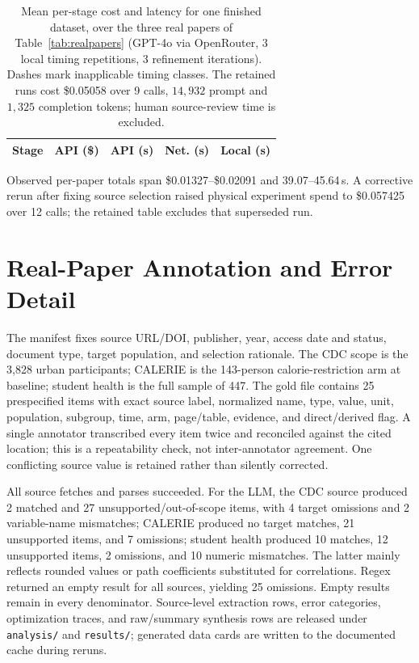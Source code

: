 \documentclass[letterpaper]{article} %
\begin{document}
\begin{table}[t]
\centering
\scriptsize
\setlength{\tabcolsep}{2.5pt}
\begin{tabular}{lrrrr}
\toprule
Stage & API (\$) & API (s) & Net. (s) & Local (s) \\
\midrule
%
\end{tabular}
\caption{Mean per-stage cost and latency for one finished dataset, over the three
real papers of Table~\ref{tab:realpapers} (GPT-4o via OpenRouter, 3 local timing
repetitions, 3 refinement iterations). Dashes mark inapplicable timing classes.
The retained runs cost \$0.05058 over 9 calls, $14{,}932$ prompt and $1{,}325$
completion tokens; human source-review time is excluded.}
\label{tab:e2ecost}
\end{table}

Observed per-paper totals span \$0.01327--\$0.02091 and 39.07--45.64\,s. A
corrective rerun after fixing source selection raised physical experiment spend
to \$0.057425 over 12 calls; the retained table excludes that superseded run.

\section{Real-Paper Annotation and Error Detail}
The manifest fixes source URL/DOI, publisher, year, access date and status,
document type, target population, and selection rationale. The CDC scope is the
3,828 urban participants; CALERIE is the 143-person calorie-restriction arm at
baseline; student health is the full sample of 447. The gold file contains 25
prespecified items with exact source label, normalized name, type, value, unit,
population, subgroup, time, arm, page/table, evidence, and direct/derived flag.
A single annotator transcribed every item twice and reconciled against the cited
location; this is a repeatability check, not inter-annotator agreement. One
conflicting source value is retained rather than silently corrected.

All source fetches and parses succeeded. For the LLM, the CDC source produced
2 matched and 27 unsupported/out-of-scope items, with 4 target omissions and 2
variable-name mismatches; CALERIE produced no target matches, 21 unsupported
items, and 7 omissions; student health produced 10 matches, 12 unsupported
items, 2 omissions, and 10 numeric mismatches. The latter mainly reflects
rounded values or path coefficients substituted for correlations. Regex
returned an empty result for all sources, yielding 25 omissions. Empty results
remain in every denominator. Source-level extraction rows, error categories,
optimization traces, and raw/summary synthesis rows are released under
\texttt{analysis/} and \texttt{results/}; generated data cards are written to
the documented cache during reruns.
\end{document}
